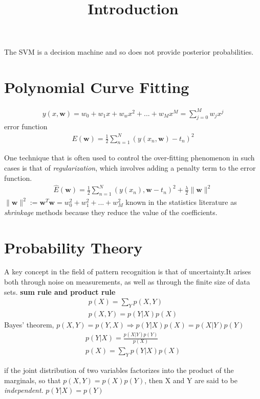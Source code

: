 \documentclass[a4paper]{article}
\begin{document}
\title{Introduction}
\author{}
\maketitle

The SVM is a decision machine and so does not provide posterior probabilities.
\section{Polynomial Curve Fitting}

\begin{align}
y(x, \mathbf{w}) = w_0+w_1x+w_wx^2+...+w_Mx^M = \sum_{j=0}^M w_jx^j
\end{align}
error function
\begin{align}
E(\mathbf{w}) = \frac{1}{2} \sum_{n=1}^N (y(x_n,\mathbf{w})-t_n)^2
\end{align}

One technique that is often used to control the over-fitting
phenomenon in such cases is that of \textit{regularization}, which involves adding a penalty term to the error function.
\begin{align}
\widehat{E}(\mathbf{w}) = \frac{1}{2} \sum_{n=1}^N
  (y(x_n),\mathbf{w}-t_n)^2 + \frac{\lambda}{2} \|\mathbf{w}\|^2
\end{align}
$ \|\mathbf{w}\|^2 := \mathbf{w}^T\mathbf{w} = w_0^2+w_1^2+...+w_M^2 $
known in the statistics literature as \textit{shrinkage} methods
because they reduce the value of the coefficients.



\section{Probability Theory}
A key concept in the field of pattern recognition is that of
uncertainty.It arises both through noise on measurements, as well as through the finite size of data sets.
\textbf{sum rule and product rule}
\begin{align*}
p(X) = \sum_Y p(X,Y)\\
p(X,Y) = p(Y|X) p(X)
\end{align*}
Bayes' theorem, $p(X,Y) = p(Y,X) \Rightarrow p(Y|X) p(X) = p(X|Y)p(Y)$
\begin{align*}
p(Y|X) = \frac{p(X|Y)p(Y)}{p(X)}\\
p(X) = \sum_Y p(Y|X) p(X)
\end{align*}

if the joint distribution of two variables factorizes into the product
of the marginals, so that $p(X, Y) = p(X)p(Y)$, then X and Y are said
to be \textit{independent}. $p(Y |X) = p(Y)$
\end{document}
